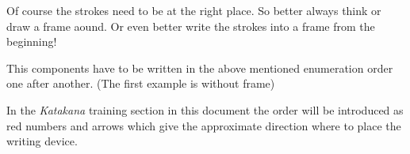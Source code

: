\bigskip
{}
\bigskip
{}
\bigskip
{}

Of course the strokes need to be at the right place. So better always think or
draw a frame aound. Or even better write the strokes into a frame from the
beginning!

\bigskip
{}
\bigskip
{}
\bigskip
{}


\bigskip

This components have to be written in the above mentioned enumeration order one
after another. (The first example is without frame)

\bigskip
{}
\bigskip
{}
\bigskip
{}

%
%

\bigskip
{}
\bigskip
{}
\bigskip
{}

\bigskip

In the \textit{Katakana} training section in this document the order will be
introduced as red numbers and arrows which give the approximate direction where
to place the writing device.

\bigskip

